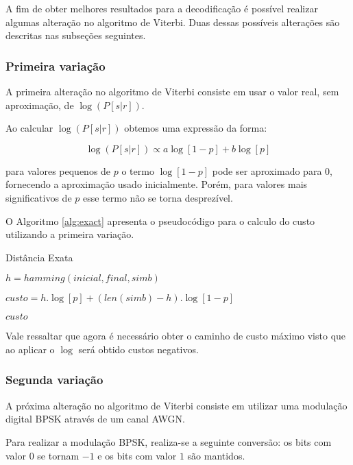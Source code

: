 A fim de obter melhores resultados para a decodificação é possível realizar algumas alteração no algoritmo de Viterbi. Duas dessas possíveis alterações são descritas nas subseções seguintes.

\subsubsection{Primeira variação}

A primeira alteração no algoritmo de Viterbi consiste em usar o valor real, sem aproximação, de $\log(P[s|r])$. 

Ao calcular $\log(P[s|r])$ obtemos uma expressão da forma:

\begin{equation}
	\log(P[s|r]) \propto a\log[1-p] + b\log[p]
\end{equation}

para valores pequenos de $p$ o termo $\log[1-p]$ pode ser aproximado para $0$, fornecendo a aproximação usado inicialmente. Porém, para valores mais significativos de $p$ esse termo não se torna desprezível.

O Algoritmo \ref{alg:exact} apresenta o pseudocódigo para o calculo do custo utilizando a primeira variação.

\begin{algorithm}[h!]
	\caption{Distância Exata}
	\label{alg:exact}
	\begin{algorithmic}[Message]		
		\State $h = hamming(inicial, final, simb)$
		
		\State $custo = h.\log[p] + (len(simb) - h).\log[1-p]$
			
		\Return $custo$
		\EndProcedure
	\end{algorithmic}
\end{algorithm}

Vale ressaltar que agora é necessário obter o caminho de custo máximo visto que ao aplicar o $\log$ será obtido custos negativos. 

\subsubsection{Segunda variação}

A próxima alteração no algoritmo de Viterbi consiste em utilizar uma modulação digital BPSK através de um canal AWGN. 

Para realizar a modulação BPSK, realiza-se a seguinte conversão: os bits com valor $0$ se tornam $-1$ e os bits com valor $1$ são mantidos.

